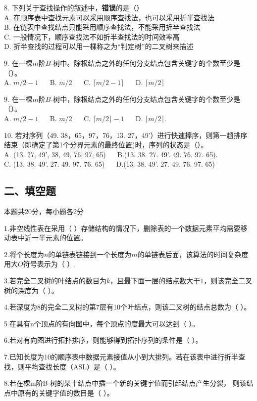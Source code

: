 8. 下列关于查找操作的叙述中，\textbf{错误}的是（） \\
A. 在顺序表中查找元素可以采用顺序查找法，也可以采用折半查找法 \\
B. 在链表中查找结点只能采用顺序查找法，不能采用折半查找法 \\
C. 一般情况下，顺序查找法不如折半查找法的时间效率高 \\
D. 折半查找的过程可以用一棵称之为“判定树”的二叉树来描述

9. 在一棵$m$阶$B$-树中。除根结点之外的任何分支结点包含关键字的个数至少是（）。 \\
A. $m/2-1$ $\quad$ B. $m/2$ $\quad$ C. $\lceil m/2-1 \rceil $ $\quad$ D. $\lceil m/2 \rceil $

9. 在一棵$m$阶$B$-树中，除根结点之外的任何分支结点包含关键字的个数至少是（）。 \\
A. $m/2-1$ $\quad$ B. $m/2$ $\quad$ C. $\lceil m/2 \rceil-1$ $\quad$ D. $\lceil m/2 \rceil$.

10. 若对序列（49. 38，65，97，76，13. 27，49'）进行快速捧序，则第一趟排序结束（即确定了第1个分界元素的最终位置)时，序列的状态是（）。 \\
A. (13. 27, 49', 38, 49, 76, 97, 65) $\quad$ B.(13. 38. 27. 49'. 49. 76. 97. 65). \\
C. (13. 38. 49'. 27. 49. 97. 76. 65) $\quad$ D.(13. 38. 49'. 27. 49. 76. 97. 65)

\subsection{二、填空题}
本题共20分，每小题各2分

1.非空线性表在采用（    ）存储结构的情况下，删除表的一个数据元素平均需要移动表中近一半元素的位置。

2.将个长度为$n$的单链表链接到一个长度为$m$的单链表后面，该算法的时间复杂度用大$O$符号表示为（    ）.

3.若完全二叉树的叶结点的数目为$k$，且最下面一层的结点数大干$1$，则该完全二叉树的深度为（    ）。

4.若深度为8的完全二叉树的第7层有10个叶结点，则该二叉树的结点总数为（    ）。

5.在具有n个顶点的有向图中，每个顶点的度最大可以达到（    ）。

6.若对有向图进行拓扑排序，则能够得到拓扑序列的条件是（    ）。

7.已知长度为10的顺序表中数据元素接值从小到大排列。若在该表中进行折半查找，则平均查找长度（ASL）是（    ）。

8.若在棵m阶B-树的某十结点中插一个新的关键宇值而引起结点产生分裂，
则该结点中原有的关键字值的数目是（    ）。

